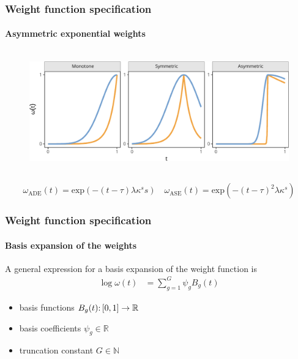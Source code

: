 \documentclass{snedecorbeamer}
\begin{document}
\begin{frame}
  \frametitle{Weight function specification}
  \framesubtitle{Asymmetric exponential weights}

  \begin{figure}
    \centering
    \includegraphics[height=14em]{inc/few_weight_profiles_fsc140.pdf}
  \end{figure}
  \begin{equation}
    \omega_{\mathrm{ADE}}(t) = \text{exp}\left(-(t - \tau) \lambda \kappa^s
      s\right)
    \quad
    \omega_{\mathrm{ASE}}(t) = \text{exp}\left(-{(t - \tau)}^2 \lambda \kappa^s
    \right)
  \end{equation}

\end{frame}

\begin{frame}
  \frametitle{Weight function specification}
  \framesubtitle{Basis expansion of the weights}

  A general expression for a basis expansion of the weight function is
  \begin{align}
    \log\omega(t)
    \label{eq:04-pcws-bew-log}
    &=\sum_{g=1}^{G}\psi_g B_g(t)
  \end{align}

  \begin{itemize}
  \item basis functions $B_g(t)\mathpunct{:}[0,1]\to\mathbb{R}$
  \item basis coefficients $\psi_g\in\mathbb{R}$
  \item truncation constant $G\in\mathbb{N}$
  \end{itemize}

\end{frame}
\end{document}
